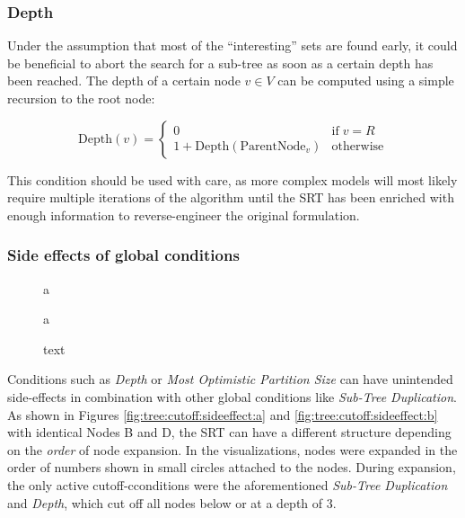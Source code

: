 		\subsubsection{Depth}

			Under the assumption that most of the \enquote{interesting} sets are found early, it could be beneficial to abort the search for a sub-tree as soon as a certain depth has been reached.
			The depth of a certain node $v \in V$ can be computed using a simple recursion to the root node:

			\begin{equation*}
				\mathrm{Depth}(v) = \begin{cases}
					0 & \text{if} \; v = R \\
					1 + \mathrm{Depth}(\mathrm{ParentNode}_v) & \mathrm{otherwise}
				\end{cases}
			\end{equation*}

			This condition should be used with care, as more complex models will most likely require multiple iterations of the algorithm until the \ac{SRT} has been enriched with enough information to reverse-engineer the original formulation.

			\clearpage

		\subsubsection{Side effects of global conditions}

			\begin{figure}[ht!]
				\centering
				\begin{minipage}[t]{0.45\textwidth}
					\vspace{0pt}
					
					\caption{a}
					\label{fig:tree:cutoff:sideeffect:a}
				\end{minipage}
				\begin{minipage}[t]{0.45\textwidth}
					\vspace{0pt}
					
					\vfill
					\caption{a}
					\label{fig:tree:cutoff:sideeffect:b}
				\end{minipage}
				\caption{text}
				\label{fig:tree:cutoff:mos}
			\end{figure}

			Conditions such as \textit{Depth} or \textit{Most Optimistic Partition Size} can have unintended side-effects in combination with other global conditions like \textit{Sub-Tree Duplication}.
			As shown in Figures \ref{fig:tree:cutoff:sideeffect:a} and \ref{fig:tree:cutoff:sideeffect:b} with identical Nodes B and D, the \ac{SRT} can have a different structure depending on the \textit{order} of node expansion. In the visualizations, nodes were expanded in the order of numbers shown in small circles attached to the nodes. During expansion, the only active cutoff-cconditions were the aforementioned \textit{Sub-Tree Duplication} and \textit{Depth}, which cut off all nodes below or at a depth of 3.

